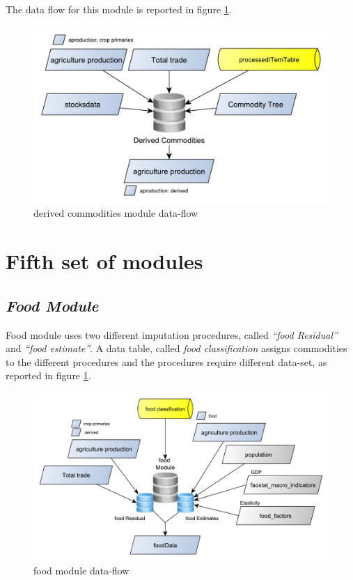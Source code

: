\documentclass[]{article}
\begin{document}
The data flow for this module is reported in figure \ref{fig:f14}.

\begin{figure}[H]

{\centering \includegraphics[width=0.6\linewidth]{images/SwsFbs/14_derived} 

}

\caption{\label{fig:f14}derived commodities module data-flow}\label{fig:f14}
\end{figure}

\section{Fifth set of modules}\label{fifth-set-of-modules}

\subsection{\texorpdfstring{\emph{Food
Module}}{Food Module}}\label{food-module}

Food module uses two different imputation procedures, called
\emph{``food Residual''} and \emph{``food estimate''}. A data table,
called \emph{food classification} assigns commodities to the different
procedures and the procedures require different data-set, as reported in
figure \ref{fig:f14}.

\begin{figure}[H]

{\centering \includegraphics[width=0.8\linewidth]{images/SwsFbs/15_food} 

}

\caption{\label{fig:f15}food module data-flow}\label{fig:f15}
\end{figure}
\end{document}
